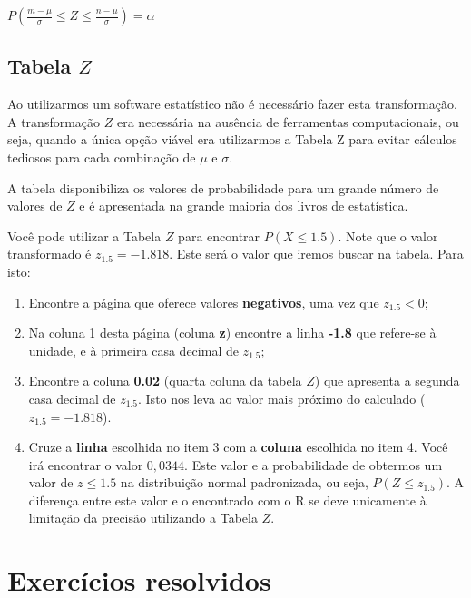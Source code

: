 \documentclass[
]{book}
\begin{document}
\(P(\frac{m - \mu}{\sigma} \le Z \le \frac{n - \mu}{\sigma}) = \alpha\)

\hypertarget{tabela-z}{%
\subsection{\texorpdfstring{Tabela \(Z\)}{Tabela Z}}\label{tabela-z}}

Ao utilizarmos um software estatístico não é necessário fazer esta transformação. A transformação \(Z\) era necessária na ausência de ferramentas computacionais, ou seja, quando a única opção viável era utilizarmos a Tabela Z para evitar cálculos tediosos para cada combinação de \(\mu\) e \(\sigma\).

A tabela disponibiliza os valores de probabilidade para um grande número de valores de \(Z\) e é apresentada na grande maioria dos livros de estatística.

Você pode utilizar a Tabela \(Z\) para encontrar \(P(X \le 1.5)\). Note que o valor transformado é \(z_{1.5} = -1.818\). Este será o valor que iremos buscar na tabela. Para isto:

\begin{enumerate}
\def\labelenumi{\arabic{enumi}.}
\item
  Encontre a página que oferece valores \textbf{negativos}, uma vez que \(z_{1.5} < 0\);
\item
  Na coluna 1 desta página (coluna \textbf{z}) encontre a linha \textbf{-1.8} que refere-se à unidade, e à primeira casa decimal de \(z_{1.5}\);
\item
  Encontre a coluna \textbf{0.02} (quarta coluna da tabela \(Z\)) que apresenta a segunda casa decimal de \(z_{1.5}\). Isto nos leva ao valor mais próximo do calculado (\(z_{1.5} = -1.818\)).
\item
  Cruze a \textbf{linha} escolhida no item 3 com a \textbf{coluna} escolhida no item 4. Você irá encontrar o valor \(0,0344\). Este valor e a probabilidade de obtermos um valor de \(z \le 1.5\) na distribuição normal padronizada, ou seja, \(P(Z \le z_{1.5})\). A diferença entre este valor e o encontrado com o R se deve unicamente à limitação da precisão utilizando a Tabela \(Z\).
\end{enumerate}

\hypertarget{exercuxedcios-resolvidos}{%
\section{Exercícios resolvidos}\label{exercuxedcios-resolvidos}}
\end{document}
